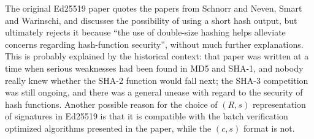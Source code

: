 \documentclass{llncs}
\begin{document}
The original Ed25519 paper\cite{BerDuiLanSchYan2012} quotes the papers
from Schnorr\cite{Sch1989} and Neven, Smart and
Warinschi\cite{NevSmaWar2009}, and discusses the possibility of using a
short hash output, but ultimately rejects it because ``the use of
double-size hashing helps alleviate concerns regarding hash-function
security'', without much further explanations. This is probably
explained by the historical context: that paper was written at a time
when serious weaknesses had been found in MD5 and SHA-1, and nobody
really knew whether the SHA-2 function would fall next; the SHA-3
competition was still ongoing, and there was a general unease with
regard to the security of hash functions. Another possible reason for
the choice of $(R,s)$ representation of signatures in Ed25519 is that it
is compatible with the batch verification optimized algorithms presented
in the paper, while the $(c,s)$ format is not.
\end{document}
